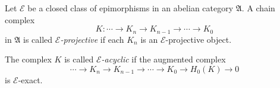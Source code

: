 Let $\mathcal{E}$ be a closed class of epimorphisms in an abelian category $\mathfrak{A}$. A chain complex
\[
K : \cdots \to K_n \to K_{n-1} \to \cdots \to K_0
\]
in $\mathfrak{A}$ is called {\it $\mathcal{E}$-projective} if each $K_n$ is an $\mathcal{E}$-projective object.

The complex $K$ is called {\it $\mathcal{E}$-acyclic} if the augmented complex
\[
\cdots \to K_n \to K_{n-1} \to \cdots \to K_0 \to H_0(K) \to 0
\]
is $\mathcal{E}$-exact.
